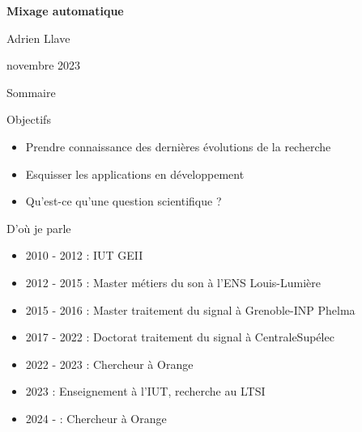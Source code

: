 \documentclass[9pt, aspectratio=169]{beamer}
\title{}
\author{Adrien Llave}
\institute{CentraleSupélec/IETR}
\begin{document}
\begin{withoutheadline}
\begin{withoutfootline}
\begin{frame}
	\vspace{0.5cm}
	\textbf{\large Mixage automatique}
	
	\vspace{0.7cm}
	{\small Adrien Llave}

	\footnotesize novembre 2023
\end{frame}
\end{withoutfootline}
\end{withoutheadline}

\begin{withoutheadline}
\begin{frame}{Sommaire}
	\tableofcontents[sectionstyle=show,subsectionstyle=show/shaded/hide,subsubsectionstyle=show/shaded/hide]
\end{frame}
\end{withoutheadline}


\begin{frame}{Objectifs} %
\begin{center}

    \begin{itemize}
        \item Prendre connaissance des dernières évolutions de la recherche
        \item Esquisser les applications en développement
        \item Qu'est-ce qu'une question scientifique ?

    \end{itemize}
\end{center}
\end{frame}

\begin{frame}{D'où je parle} %
\begin{center}

    \begin{itemize}
        \item 2010 - 2012 : IUT GEII
        \item 2012 - 2015 : Master métiers du son à l'ENS Louis-Lumière
        \item 2015 - 2016 : Master traitement du signal à Grenoble-INP Phelma
        \item 2017 - 2022 : Doctorat traitement du signal à CentraleSupélec
        \item 2022 - 2023 : Chercheur à Orange
        \item 		 2023 : Enseignement à l'IUT, recherche au LTSI
        \item 2024 -      : Chercheur à Orange
    \end{itemize}
\end{center}
\end{frame}
\end{document}
